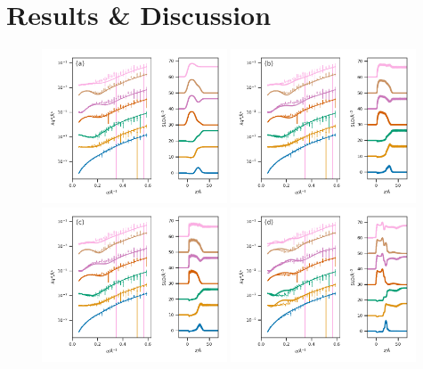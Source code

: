 \documentclass[amsmath,amssymb,twocolumn,superscriptaddress]{revtex4-1}
\begin{document}
\section{Results \& Discussion}
%
\begin{figure}
 \centering
 \includegraphics[width=0.49\textwidth]{figures/trad_30}
 \includegraphics[width=0.49\textwidth]{figures/sim_slipids_30} \\
 \includegraphics[width=0.49\textwidth]{figures/sim_berger_30}
 \includegraphics[width=0.49\textwidth]{figures/sim_martini_30}

\end{figure}
\end{document}
